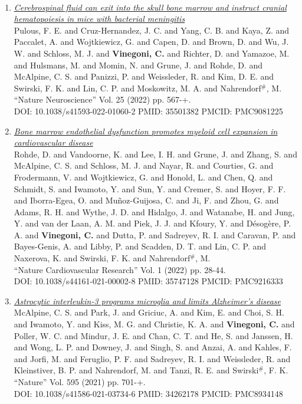 \documentclass{resume}
\begin{document}
\begin{category}{~~}
\begin{enumerate}
\item \href{https://cvinegoni.github.io/assets/pdf/papers/2022-NN.PDF}{\it  Cerebrospinal fluid can exit into the skull bone marrow and instruct cranial hematopoiesis in mice with bacterial meningitis} \\ Pulous, F. E. and Cruz-Hernandez, J. C. and Yang, C. B. and Kaya, Z. and Paccalet, A. and Wojtkiewicz, G. and Capen, D. and Brown, D. and Wu, J. W. and Schloss, M. J. and {\bf Vinegoni, C.} and Richter, D. and Yamazoe, M. and Hulsmans, M. and Momin, N. and Grune, J. and Rohde, D. and McAlpine, C. S. and Panizzi, P. and Weissleder, R. and Kim, D. E. and Swirski, F. K. and Lin, C. P. and Moskowitz, M. A. and Nahrendorf$^\#$, M. \\ ``Nature Neuroscience'' Vol. 25 (2022) pp. 567-+. \\ DOI: 10.1038/s41593-022-01060-2 PMID: 35501382 PMCID: PMC9081225

\item \href{https://cvinegoni.github.io/assets/pdf/papers/2022-NCR-1.pdf}{\it  Bone marrow endothelial dysfunction promotes myeloid cell expansion in cardiovascular disease} \\ Rohde, D. and Vandoorne, K. and Lee, I. H. and Grune, J. and Zhang, S. and McAlpine, C. S. and Schloss, M. J. and Nayar, R. and Courties, G. and Frodermann, V. and Wojtkiewicz, G. and Honold, L. and Chen, Q. and Schmidt, S. and Iwamoto, Y. and Sun, Y. and Cremer, S. and Hoyer, F. F. and Iborra-Egea, O. and Muñoz-Guijosa, C. and Ji, F. and Zhou, G. and Adams, R. H. and Wythe, J. D. and Hidalgo, J. and Watanabe, H. and Jung, Y. and van der Laan, A. M. and Piek, J. J. and Kfoury, Y. and Désogère, P. A. and {\bf Vinegoni, C.} and Dutta, P. and Sadreyev, R. I. and Caravan, P. and Bayes-Genis, A. and Libby, P. and Scadden, D. T. and Lin, C. P. and Naxerova, K. and Swirski, F. K. and Nahrendorf$^\#$, M. \\ ``Nature Cardiovascular Research'' Vol. 1 (2022) pp. 28-44. \\ DOI: 10.1038/s44161-021-00002-8 PMID: 35747128 PMCID: PMC9216333

\item \href{https://cvinegoni.github.io/assets/pdf/papers/2021-NATURE.pdf}{\it  Astrocytic interleukin-3 programs microglia and limits Alzheimer's disease} \\ McAlpine, C. S. and Park, J. and Griciuc, A. and Kim, E. and Choi, S. H. and Iwamoto, Y. and Kiss, M. G. and Christie, K. A. and {\bf Vinegoni, C.} and Poller, W. C. and Mindur, J. E. and Chan, C. T. and He, S. and Janssen, H. and Wong, L. P. and Downey, J. and Singh, S. and Anzai, A. and Kahles, F. and Jorfi, M. and Feruglio, P. F. and Sadreyev, R. I. and Weissleder, R. and Kleinstiver, B. P. and Nahrendorf, M. and Tanzi, R. E. and Swirski$^\#$, F. K. \\ ``Nature'' Vol. 595 (2021) pp. 701-+. \\ DOI: 10.1038/s41586-021-03734-6 PMID: 34262178 PMCID: PMC8934148


\end{enumerate}
\end{category}
\end{document}
